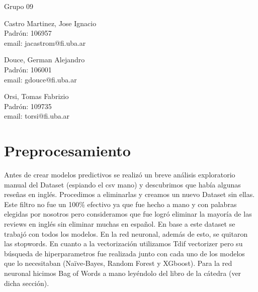 \documentclass{article}
\begin{document}
\begin{titlepage}
  \vspace{0.4cm}
  \begin{center}
    {\Large{Grupo 09}}\\
    \vspace{0.6cm}
    {\begin{minipage}[t]{.32\textwidth}
        \begin{center}
	Castro  Martinez, Jose Ignacio\\
          {\small{Padrón: 106957}}\\
          {\small{email: jacastrom@fi.uba.ar}}
        \end{center}
	\end{minipage}
	\begin{minipage}[t]{.32\textwidth}
        \begin{center}
	Douce, German Alejandro\\
          {\small{Padrón: 106001}}\\
          {\small{email: gdouce@fi.uba.ar}}\\
        \end{center}
      \end{minipage}
      \begin{minipage}[t]{.32\textwidth}
        \begin{center}
          Orsi, Tomas Fabrizio\\
          {\small{Padrón: 109735}}\\
          {\small{email: torsi@fi.uba.ar}}
        \end{center}
      \end{minipage}}
  \end{center}
\end{titlepage}


\section*{Preprocesamiento}

Antes de crear modelos predictivos se realizó un breve análisis exploratorio manual del Dataset (espiando el csv mano) y descubrimos que había algunas reseñas en inglés. Procedimos a eliminarlas y creamos un nuevo Dataset sin ellas. Este filtro no fue un 100\% efectivo ya que fue hecho a mano y con palabras elegidas por nosotros pero consideramos que fue logró eliminar la mayoría de las reviews en inglés sin eliminar muchas en español. En base a este dataset se trabajó con todos los modelos. En la red neuronal, además de esto, se quitaron las stopwords.
En cuanto a la vectorización utilizamos Tdif vectorizer pero su búsqueda de hiperparametros fue realizada junto con cada uno de los modelos que lo necesitaban (Naïve-Bayes, Random Forest y XGboost). Para la red neuronal hicimos Bag of Words a mano leyéndolo del libro de la cátedra (ver dicha sección).
\end{document}
